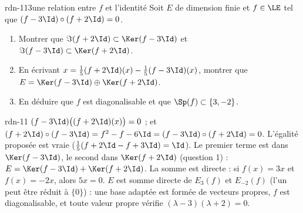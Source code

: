 \begin{exo}{rdn-11}{3}{une relation entre $f$ et l'identité}
Soit $E$ de dimension finie et $f\in\LE$ tel que $(f-3\Id)\circ(f+2\Id)=0$.
\begin{enumerate}
\item Montrer que $\Im(f+2\Id)\subset\Ker(f-3\Id)$ et $\Im(f-3\Id)\subset\Ker(f+2\Id)$.
\item En écrivant $x=\frac15(f+2\Id)(x)-\frac15(f-3\Id)(x)$, montrer que $E=\Ker(f-3\Id)\oplus\Ker(f+2\Id)$.
\item En déduire que $f$ est diagonalisable et que $\Sp(f)\subset\{3,-2\}$.
\end{enumerate}
\end{exo}
\begin{corrige}{rdn-11}
 $(f-3\Id)\big((f+2\Id)(x)\big)=0$ ; et $(f+2\Id)\circ(f-3\Id)=f^2-f-6\Id=(f-3\Id)\circ(f+2\Id)=0$.
 L'égalité proposée est vraie ($\frac15(f+2\Id-f+3\Id)=\Id$). Le premier terme est dans $\Ker(f-3\Id)$, le second dans
$\Ker(f+2\Id)$ (question 1) : $E=\Ker(f-3\Id)+\Ker(f+2\Id)$. La somme est directe : si $f(x)=3x$ et $f(x)=-2x$, alors $5x=0$.
 $E$ est somme directe de $E_3(f)$ et $E_{-2}(f)$ (l'un peut être réduit à $\{0\}$) : une base adaptée est formée de vecteurs
propres, $f$ est diagonalisable, et toute valeur propre vérifie $(\lambda-3)(\lambda+2)=0$.
\end{corrige}

